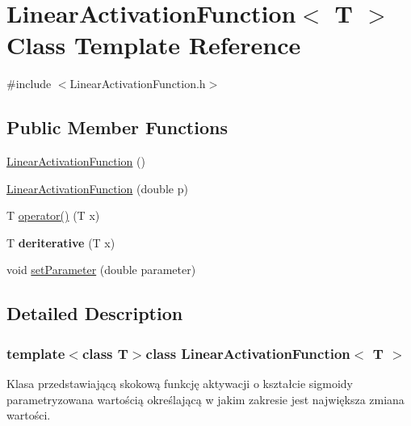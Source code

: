 \hypertarget{class_linear_activation_function}{\section{\-Linear\-Activation\-Function$<$ \-T $>$ \-Class \-Template \-Reference}
\label{class_linear_activation_function}
}


{\ttfamily \#include $<$\-Linear\-Activation\-Function.\-h$>$}

\subsection*{\-Public \-Member \-Functions}
\begin{DoxyCompactItemize}
\item 
\hyperlink{class_linear_activation_function_a0474630a90119eb50d775b3e9aa46b30}{\-Linear\-Activation\-Function} ()
\item 
\hyperlink{class_linear_activation_function_ada030e1ea55f5127fdd7455279177be1}{\-Linear\-Activation\-Function} (double p)
\item 
\-T \hyperlink{class_linear_activation_function_a97e4c739f6cfb4b8b639e5921f6d4733}{operator()} (\-T x)
\item 
\hypertarget{class_linear_activation_function_aed111abd3fbc37e8a0faff788258a97d}{\-T {\bfseries deriterative} (\-T x)}\label{class_linear_activation_function_aed111abd3fbc37e8a0faff788258a97d}

\item 
void \hyperlink{class_linear_activation_function_ad7a5e2511224ce15c616e1aac7f95706}{set\-Parameter} (double parameter)
\end{DoxyCompactItemize}


\subsection{\-Detailed \-Description}
\subsubsection*{template$<$class T$>$class Linear\-Activation\-Function$<$ T $>$}

\-Klasa przedstawiającą skokową funkcję aktywacji o kształcie sigmoidy parametryzowana wartością określającą w jakim zakresie jest największa zmiana wartości. 

